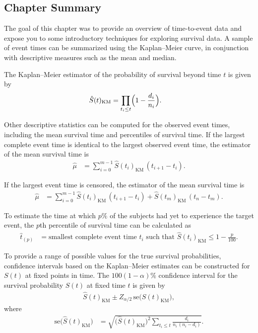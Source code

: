\documentclass[
]{book}
\begin{document}
\hypertarget{chapter-summary-6}{%
\subsection{Chapter Summary}\label{chapter-summary-6}}

The goal of this chapter was to provide an overview of time-to-event data and expose you to some introductory techniques for exploring survival data. A sample of event times can be summarized using the Kaplan--Meier curve, in conjunction with descriptive measures such as the mean and median.

The Kaplan--Meier estimator of the probability of survival beyond time \(t\) is given by
\begin{align}
\hat S(t)_{\mathrm{KM}} &= \prod_{t_i \le t} \Bigl(1 - \frac{d_i}{n_i}\Bigr).
\end{align}

Other descriptive statistics can be computed for the observed event times, including the mean survival time and percentiles of survival time. If the largest complete event time is identical to the largest observed event time, the estimator of the mean survival time is
\begin{align}
\hat \mu &= \sum_{i=0}^{m-1} \hat S(t_i)_{\mathrm{KM}}\,(t_{i+1} - t_i).
\end{align}

If the largest event time is censored, the estimator of the mean survival time is
\begin{align}
\hat \mu &= \sum_{i=0}^{m-1} \hat S(t_i)_{\mathrm{KM}}\,(t_{i+1} - t_i)
+ \hat S(t_m)_{\mathrm{KM}}\,(t_n - t_m).
\end{align}

To estimate the time at which \(p\%\) of the subjects had yet to experience the target event, the \(p\)th percentile of survival time can be calculated as
\begin{align}
\hat t_{(p)} &= \text{smallest complete event time }t_i\text{ such that }
\hat S(t_i)_{\mathrm{KM}} \le 1 - \frac{p}{100}.
\end{align}

To provide a range of possible values for the true survival probabilities, confidence intervals based on the Kaplan--Meier estimates can be constructed for \(S(t)\) at fixed points in time. The \(100(1 - \alpha)\%\) confidence interval for the survival probability \(S(t)\) at fixed time \(t\) is given by
\begin{align}
\hat S(t)_{\mathrm{KM}} \pm Z_{\alpha/2}\,\mathrm{se}\bigl(\hat S(t)_{\mathrm{KM}}\bigr),
\end{align}
where
\begin{align}
\mathrm{se}\bigl(\hat S(t)_{\mathrm{KM}}\bigr)
&= \sqrt{
\bigl(\hat S(t)_{\mathrm{KM}}\bigr)^2 
\sum_{t_i \le t} \frac{d_i}{n_i\,(n_i - d_i)}
}.
\end{align}
\end{document}
